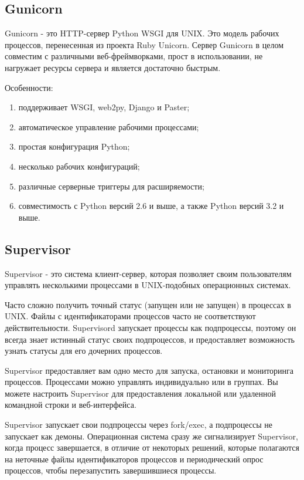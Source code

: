 \subsection{Gunicorn}
\label{sec:development:gunicorn}

Gunicorn - это HTTP-сервер Python WSGI для UNIX. Это модель рабочих процессов, перенесенная из проекта Ruby Unicorn. Сервер Gunicorn в целом совместим с различными веб-фреймворками, прост в использовании, не нагружает ресурсы сервера и является достаточно быстрым.

Особенности:
\begin{enumerate}
  \item поддерживает WSGI, web2py, Django и Paster;
  \item автоматическое управление рабочими процессами;
  \item простая конфигурация Python;
  \item несколько рабочих конфигураций;
  \item различные серверные триггеры для расширяемости;
  \item совместимость с Python версий 2.6 и выше, а также Python версий 3.2 и выше.
\end{enumerate}

\subsection{Supervisor}
\label{sec:development:supervisor}

Supervisor - это система клиент-сервер, которая позволяет своим пользователям управлять несколькими процессами в UNIX-подобных операционных системах.

Часто сложно получить точный статус (запущен или не запущен) в процессах в UNIX. Файлы с идентификаторами процессов часто не соответствуют действительности. Supervisord запускает процессы как подпроцессы, поэтому он всегда знает истинный статус своих подпроцессов, и предоставляет возможность узнать статусы для его дочерних процессов.

Supervisor предоставляет вам одно место для запуска, остановки и мониторинга процессов. Процессами можно управлять индивидуально или в группах. Вы можете настроить Supervisor для предоставления локальной или удаленной командной строки и веб-интерфейса.

Supervisor запускает свои подпроцессы через fork/exec, а подпроцессы не запускает как демоны. Операционная система сразу же сигнализирует Supervisor, когда процесс завершается, в отличие от некоторых решений, которые полагаются на неточные файлы идентификаторов процессов и периодический опрос процессов, чтобы перезапустить завершившиеся процессы.

